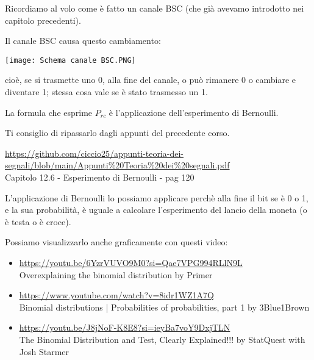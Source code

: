 \begin{tcolorbox}
    Ricordiamo al volo come è fatto un canale BSC (che già avevamo introdotto nei capitolo precedenti). \newline 

    Il canale BSC causa questo cambiamento: \newline

    \texttt{[image: Schema canale BSC.PNG]}

    cioè, se si trasmette uno 0, alla fine del canale, o può rimanere 0 o cambiare e diventare 1; 
    stessa cosa vale se è stato trasmesso un 1. \newline 

    La formula che esprime $P_{rc}$ è l'applicazione dell'esperimento di Bernoulli. \newline 

    Ti consiglio di ripassarlo dagli appunti del precedente corso. \newline 

    \url{https://github.com/ciccio25/appunti-teoria-dei-segnali/blob/main/Appunti%20Teoria%20dei%20segnali.pdf} \\
    Capitolo 12.6 - Esperimento di Bernoulli - pag 120 \newline 

    L'applicazione di Bernoulli lo possiamo applicare perchè alla fine il bit se è 0 o 1, e la sua probabilità, 
    è uguale a calcolare l'esperimento del lancio della moneta (o è testa o è croce). \newline 

    Possiamo visualizzarlo anche graficamente con questi video: 

    \begin{itemize}
        \item \url{https://youtu.be/6YzrVUVO9M0?si=Qae7VPG994RLlN9L} \\ Overexplaining the binomial distribution by Primer 
        \item \url{https://www.youtube.com/watch?v=8idr1WZ1A7Q} \\ Binomial distributions | Probabilities of probabilities, part 1 by 3Blue1Brown 
        \item \url{https://youtu.be/J8jNoF-K8E8?si=ieyBa7voY9DxjTLN} \\ The Binomial Distribution and Test, Clearly Explained!!! by StatQuest with Josh Starmer
    \end{itemize}
\end{tcolorbox}

